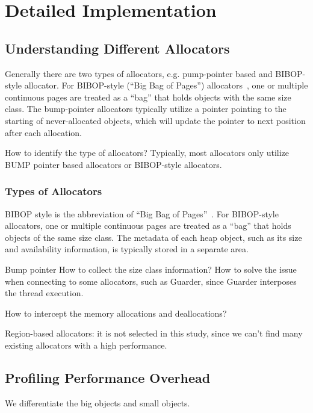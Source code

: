 \section{Detailed Implementation}





\subsection{Understanding Different Allocators}

Generally there are two types of allocators, e.g. pump-pointer based and BIBOP-style allocator. For BIBOP-style (``Big Bag of Pages'') allocators~\cite{hanson1980}, one or multiple continuous pages are treated as a ``bag'' that holds objects with the same size class.  The bump-pointer allocators typically utilize a pointer pointing to the starting of never-allocated objects, which will update the pointer to next position after each allocation.   


How to identify the type of allocators? Typically, most allocators only utilize BUMP pointer based allocators or BIBOP-style allocators. 

\subsubsection{Types of Allocators}
BIBOP style is the abbreviation of ``Big Bag of Pages''~\cite{hanson1980}.
For BIBOP-style allocators, one or multiple continuous pages are treated as a ``bag'' that holds objects of the same size class. The metadata of each heap object, such as its size and availability information, is typically stored in a separate area.

Bump pointer
How to collect the size class information?
How to solve the issue when connecting to some allocators, such as Guarder, since Guarder interposes the thread execution. 

How to intercept the memory allocations and deallocations? 

Region-based allocators: 
it is not selected in this study, since we can't find many existing allocators with a high performance. 


\subsection{Profiling Performance Overhead}

We differentiate the big objects and small objects. 

